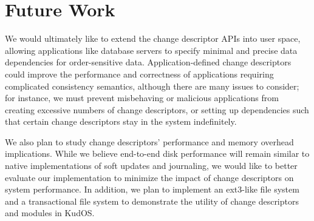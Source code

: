 
\preparagraphspacing{}
\section*{Future Work}
\label{sec:future}

We would ultimately like to extend the change descriptor APIs into
user space, allowing applications like database servers to
specify minimal and precise data dependencies for order-sensitive data.
Application-defined
change descriptors could improve the performance and correctness
of applications requiring complicated consistency semantics, although
there are many issues to consider;
for instance, we must prevent misbehaving
or malicious applications from creating excessive numbers of change
descriptors, or setting up dependencies such that certain change
descriptors stay in the system indefinitely.

We also plan to study change descriptors' performance and memory overhead
implications.
While we believe end-to-end disk performance will
remain similar to native implementations of soft updates and journaling,
we
would like to better evaluate our implementation to minimize the impact
of change descriptors on system performance. %
In addition, we plan to implement an ext3-like file system and a
transactional file system to demonstrate the utility of change
descriptors and modules in KudOS.

